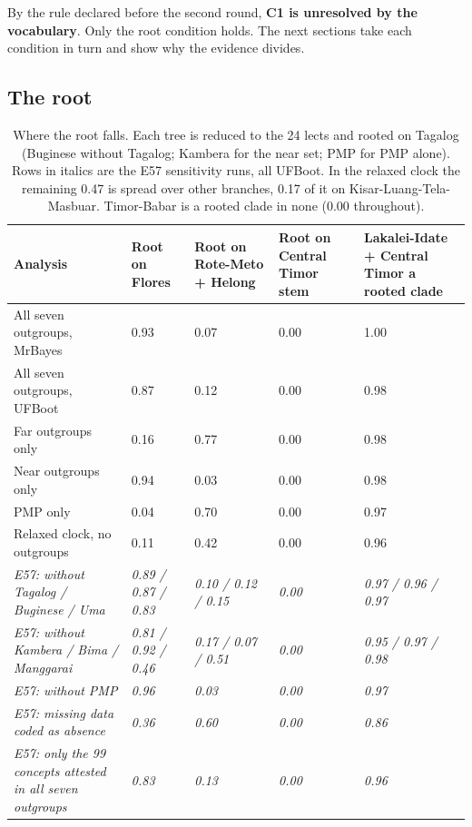 \documentclass[11pt]{article}
\newcommand{\hd}[1]{\begin{minipage}[b]{\linewidth}\raggedright #1\end{minipage}}
\begin{document}
By the rule declared before the second round, \textbf{C1 is unresolved by the vocabulary}. Only the root condition holds. The next sections take each condition in turn and show why the evidence divides.

\subsection{The root}

\begin{table}[tbp]
\caption{Where the root falls. Each tree is reduced to the 24 lects and
rooted on Tagalog (Buginese without Tagalog; Kambera for the near set;
PMP for PMP alone). Rows in italics are the E57 sensitivity runs, all
UFBoot. In the relaxed clock the remaining 0.47 is spread over other
branches, 0.17 of it on Kisar-Luang-Tela-Masbuar. Timor-Babar is a
rooted clade in none (0.00 throughout).}
\label{tab:root}
\begin{tabularx}{\linewidth}{@{}L{2.222}L{0.695}L{0.695}L{0.695}L{0.693}@{}}
\toprule
\hd{Analysis} & \hd{Root on Flores} & \hd{Root on Rote-Meto + Helong} & \hd{Root on Central Timor stem} & \hd{Lakalei-Idate + Central Timor a rooted clade} \\
\midrule
All seven outgroups, MrBayes & 0.93 & 0.07 & 0.00 & 1.00 \\
All seven outgroups, UFBoot & 0.87 & 0.12 & 0.00 & 0.98 \\
Far outgroups only & 0.16 & 0.77 & 0.00 & 0.98 \\
Near outgroups only & 0.94 & 0.03 & 0.00 & 0.98 \\
PMP only & 0.04 & 0.70 & 0.00 & 0.97 \\
Relaxed clock, no outgroups & 0.11 & 0.42 & 0.00 & 0.96 \\
\emph{E57: without Tagalog / Buginese / Uma} & \emph{0.89 / 0.87 / 0.83} & \emph{0.10 / 0.12 / 0.15} & \emph{0.00} & \emph{0.97 / 0.96 / 0.97} \\
\emph{E57: without Kambera / Bima / Manggarai} & \emph{0.81 / 0.92 / 0.46} & \emph{0.17 / 0.07 / 0.51} & \emph{0.00} & \emph{0.95 / 0.97 / 0.98} \\
\emph{E57: without PMP} & \emph{0.96} & \emph{0.03} & \emph{0.00} & \emph{0.97} \\
\emph{E57: missing data coded as absence} & \emph{0.36} & \emph{0.60} & \emph{0.00} & \emph{0.86} \\
\emph{E57: only the 99 concepts attested in all seven outgroups} & \emph{0.83} & \emph{0.13} & \emph{0.00} & \emph{0.96} \\
\bottomrule
\end{tabularx}
\end{table}
\end{document}
